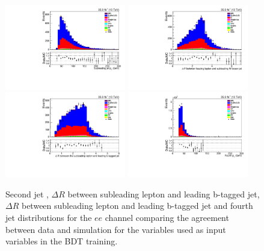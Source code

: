 \begin{figure}[h]
\centering
\includegraphics[width=0.47\textwidth]{figs/background-estimation/plots/unblinded/prompt_ee_ttbarInc/secondJetPt_NPL_ee_wMass_ee.pdf}
\includegraphics[width=0.47\textwidth]{figs/background-estimation/plots/unblinded/prompt_ee_ttbarInc/zLep1Quark2DelR_NPL_ee_wMass_ee.pdf}
\\
\includegraphics[width=0.47\textwidth]{figs/background-estimation/plots/unblinded/prompt_ee_ttbarInc/zLep2BjetDelR_NPL_ee_wMass_ee.pdf}
\includegraphics[width=0.47\textwidth]{figs/background-estimation/plots/unblinded/prompt_ee_ttbarInc/fourthJetPt_NPL_ee_wMass_ee.pdf}
\caption{
Second jet \pT, $\Delta R$ between subleading lepton and leading b-tagged jet, $\Delta R$ between subleading lepton and leading b-tagged jet and fourth jet \pT distributions for the $ee$ channel comparing the agreement between data and simulation for the variables used as input variables in the BDT training.}
\label{fig:inputFeaturesDataSimAgreement4}
\end{figure}

